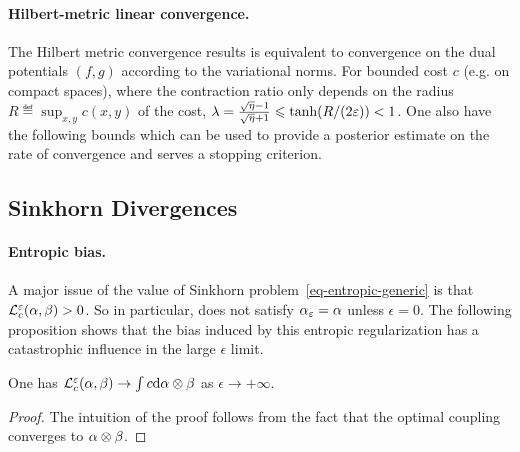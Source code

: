\paragraph{Hilbert-metric linear convergence.}

The Hilbert metric convergence results is equivalent to convergence on the dual potentials $(f,g)$ according to the variational norms. For bounded cost $c$ (e.g. on compact spaces), 
where the contraction ratio only depends on the radius $R \eqdef \sup_{x,y} c(x,y)$ of the cost, $\lambda=\frac{\sqrt{\eta}-1}{\sqrt{\eta}+1} \leqslant \text{tanh}(R/(2\varepsilon)) < 1$. One also have the following bounds
which can be used to provide a posterior estimate on the rate of convergence and serves a stopping criterion.

\subsection{Sinkhorn Divergences}
\label{sec-sinkhorn-div}


\paragraph{Entropic bias.}

A major issue of the value of Sinkhorn problem~\eqref{eq-entropic-generic} is that $\mathcal{L}_c^\varepsilon(\alpha,\beta)>0$. So in particular, 
\eq{
	\al_\epsilon = \uargmin{\be} \MK_\c^\epsilon(\al,\be)
}
does not satisfy $\alpha_\varepsilon=\alpha$ unless $\epsilon=0$. The following proposition shows that the bias induced by this entropic regularization has a catastrophic influence in the large $\epsilon$ limit.

\begin{prop}
	One has $\mathcal{L}_c^\varepsilon(\alpha,\beta) \rightarrow \int c \mathrm{d}\alpha \otimes \beta$ as $\epsilon \rightarrow +\infty$.
\end{prop}
\begin{proof}	
	The intuition of the proof follows from the fact that the optimal coupling converges to $\alpha \otimes \beta$. 
\end{proof}

